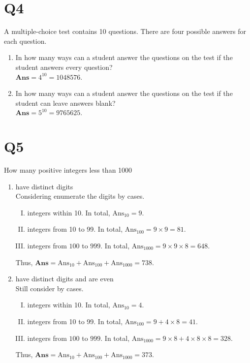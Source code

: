 \documentclass[11pt]{article}
\newenvironment{qparts}{\begin{enumerate}[{(}a{)}]}{\end{enumerate}}
\begin{document}
\section*{Q4}
A multiple-choice test contains 10 questions. There are four
possible answers for each question.
\begin{qparts}
    
    \item In how many ways can a student answer the questions on the test if the student answers every question?\\
    $\textbf{Ans}=4^{10}=1048576$.

    \item In how many ways can a student answer the questions on the test if the student can leave answers blank?\\
    $\textbf{Ans}=5^{10}=9765625$.


\end{qparts}

\section*{Q5}
How many positive integers less than 1000
\begin{qparts}
    
    \item have distinct digits\\
    Considering enumerate the digits by cases.
    \begin{enumerate}[I. ]
        \item integers within 10. In total, $\text{Ans}_{10}=9$.
        \item integers from 10 to 99. In total, $\text{Ans}_{100}=9\times 9=81$.
        \item integers from $100$ to $999$. In total, $\text{Ans}_{1000}=
        9\times 9\times 8=648$.
    \end{enumerate}
    Thus, $\textbf{Ans}=\text{Ans}_{10}+\text{Ans}_{100}+\text{Ans}_{1000}=738$.

    \item have distinct digits and are even\\
    Still consider by cases.
    \begin{enumerate}[I. ]
        \item integers within 10. In total, $\text{Ans}_{10}=4$.
        \item integers from 10 to 99. In total, $\text{Ans}_{100}=9+4\times 8=41$.
        \item integers from $100$ to $999$. In total, $\text{Ans}_{1000}=
        9\times 8+4\times 8\times 8=328$.
    \end{enumerate}
    Thus, $\textbf{Ans}=\text{Ans}_{10}+\text{Ans}_{100}+\text{Ans}_{1000}=373$.
\end{qparts}
\end{document}

